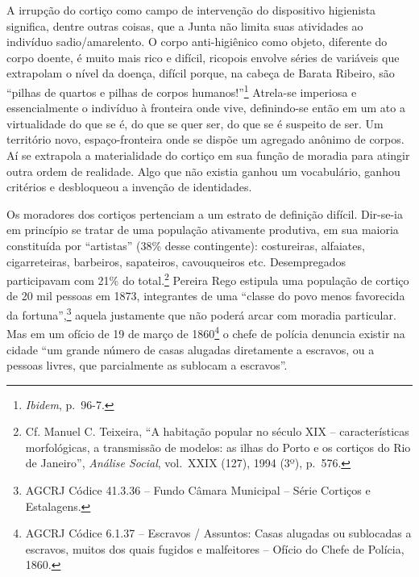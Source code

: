 A irrupção do cortiço como campo de intervenção do dispositivo
higienista significa, dentre outras coisas, que a Junta não limita suas
atividades ao indivíduo sadio/amarelento. O corpo anti-higiênico como
objeto, diferente do corpo doente, é muito mais rico e difícil, ricopois
envolve séries de variáveis que extrapolam o nível da doença, difícil
porque, na cabeça de Barata Ribeiro, são ``pilhas de quartos e pilhas de
corpos humanos!''\footnote{\emph{Ibidem}, p.~96-7.} Atrela-se imperiosa
e essencialmente o indivíduo à fronteira onde vive, definindo-se então
em um ato a virtualidade do que se é, do que se quer ser, do que se é
suspeito de ser. Um território novo, espaço-fronteira onde se dispõe um
agregado anônimo de corpos. Aí se extrapola a materialidade do cortiço
em sua função de moradia para atingir outra ordem de realidade. Algo que
não existia ganhou um vocabulário, ganhou critérios e desbloqueou a
invenção de identidades.

Os moradores dos cortiços pertenciam a um estrato de definição difícil.
Dir-se-ia em princípio se tratar de uma população ativamente produtiva,
em sua maioria constituída por ``artistas'' (38\% desse contingente):
costureiras, alfaiates, cigarreteiras, barbeiros, sapateiros,
cavouqueiros etc. Desempregados participavam com 21\% do
total.\footnote{Cf. Manuel C. Teixeira, ``A habitação popular no século
  XIX -- características morfológicas, a transmissão de modelos: as
  ilhas do Porto e os cortiços do Rio de Janeiro'', \emph{Análise
  Social}, vol.~XXIX (127), 1994 (3º), p.~576.} Pereira Rego estipula
uma população de cortiço de 20 mil pessoas em 1873, integrantes de uma
``classe do povo menos favorecida da fortuna'',\footnote{AGCRJ Códice
  41.3.36 -- Fundo Câmara Municipal -- Série Cortiços e Estalagens.}
aquela justamente que não poderá arcar com moradia particular. Mas em um
ofício de 19 de março de 1860\footnote{AGCRJ Códice 6.1.37 -- Escravos /
  Assuntos: Casas alugadas ou sublocadas a escravos, muitos dos quais
  fugidos e malfeitores -- Ofício do Chefe de Polícia, 1860.} o chefe de
polícia denuncia existir na cidade ``um grande número de casas alugadas
diretamente a escravos, ou a pessoas livres, que parcialmente as
sublocam a escravos''.

